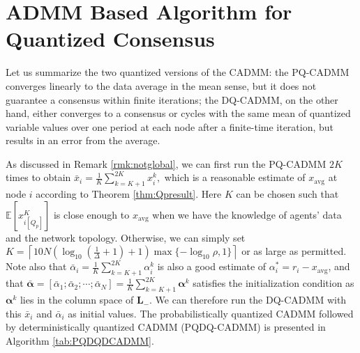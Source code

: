\documentclass[journal]{IEEEtran}
\begin{document}
\section{ADMM Based Algorithm for Quantized Consensus}
\label{sec:algorithm}
Let us summarize the two quantized versions of the CADMM: the PQ-CADMM converges linearly to the data average in the mean sense, but it does not guarantee a consensus within finite iterations; the DQ-CADMM, on the other hand, either converges to a consensus or cycles with the same mean of quantized variable values over one period at each node after a finite-time iteration, but results in an error from the average. 

As discussed in Remark \ref{rmk:notglobal}, we can first run the PQ-CADMM $2K$ times to obtain $\bar{x}_i=\frac{1}{K}\sum_{k=K+1}^{2K}x_{i}^k,$ which is a reasonable estimate of $x_\text{avg}$ at node $i$ according to Theorem \ref{thm:Qpresult}. Here $K$ can be chosen such that $\mathbb{E}[x^K_{i[Q_p]}]$ is close enough to $x_{\text{avg}}$ when we have the knowledge of agents' data and the network topology. Otherwise, we can simply set $K=\left\lceil10N\left(\log_{10}(\frac{1}{\Delta}+1)+1\right)\max\{-\log_{10}\rho,1\}\right\rceil$ or as large as permitted. Note also that $\bar{\alpha}_i = \frac{1}{K}\sum_{k=K+1}^{2K}\alpha_{i}^k$ is also a good estimate of $\alpha_i^*=r_i-x_{\text{avg}}$, and that $\bar{\bm\alpha}=[\bar{\alpha}_1;\bar{\alpha}_2;\cdots;\bar{\alpha}_N]=\frac{1}{K}\sum_{k=K+1}^{2K}\bm\alpha^k$ satisfies the initialization condition as $\bm\alpha^k$ lies in the column space of $\bm L_-$. We can therefore run the DQ-CADMM with this $\bar{x}_i$ and $\bar{\alpha}_i$ as initial values. The probabilistically quantized CADMM followed by deterministically quantized CADMM (PQDQ-CADMM) is presented in Algorithm \ref{tab:PQDQDCADMM}. 
\end{document}
